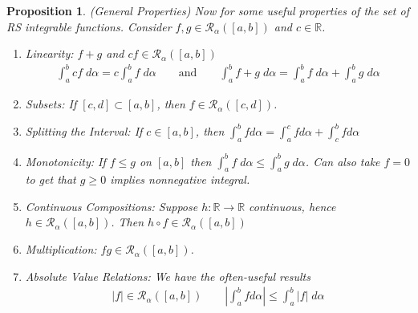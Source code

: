 \documentclass[12pt]{article}
\numberwithin{equation}{section} %
\theoremstyle{plain}
\newtheorem{prop}[thm]{Proposition}
\theoremstyle{definition}
\theoremstyle{remark}
\newcommand{\sR}{\mathscr{R}}
\begin{document}
\begin{prop}\emph{(General Properties)}
Now for some useful properties of the set of RS integrable functions.
Consider $f,g \in \mathscr{R}_\alpha([a,b])$ and $c \in \mathbb{R}$.
\begin{enumerate}[label=\emph{(\roman*)}]
    \item \emph{Linearity}: $f+g$
      and $cf \in \mathscr{R}_\alpha([a,b])$
      \begin{align*}
        \int^b_a cf \; d\alpha = c \int^b_a f\; d\alpha
          \qquad \text{and} \qquad
          \int^b_a f+g\; d\alpha = \int^b_a f \;d\alpha +
          \int^b_a g\; d\alpha
      \end{align*}
    \item \emph{Subsets}: If $[c,d]\subset[a,b]$,
      then $f \in \mathscr{R}_\alpha([c,d])$.
    \item \emph{Splitting the Interval}: If $c \in [a,b]$, then
      $\int^b_a f d\alpha = \int^c_a f d\alpha + \int^b_c f d\alpha$
    \item \emph{Monotonicity}:
      If $f\leq g$ on $[a,b]$ then
      $\int^b_a f \; d\alpha \leq \int^b_a g \; d\alpha$.
      Can also take $f=0$ to get that $g\geq 0$ implies nonnegative
      integral.
    \item \emph{Continuous Compositions}:
      Suppose $h: \mathbb{R}\rightarrow\mathbb{R}$ continuous, hence
      $h\in \sR_\alpha([a,b])$.
      Then $h \circ f\in\mathscr{R}_\alpha([a,b])$
    \item \emph{Multiplication}:
      $fg\in\mathscr{R}_\alpha([a,b])$.
    \item \emph{Absolute Value Relations}:
      We have the often-useful results
      \begin{align*}
        |f| \in \mathscr{R}_\alpha([a,b])
        \qquad
        \left\lvert\int^b_a f d\alpha \right\rvert
        \leq \int^b_a |f| \; d\alpha
      \end{align*}
\end{enumerate}
\end{prop}
\end{document}
